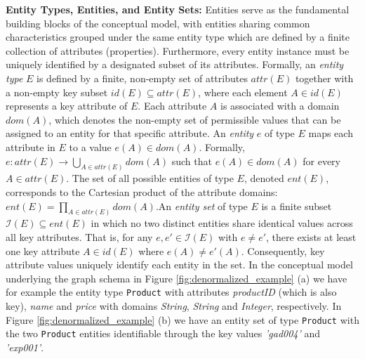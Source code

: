 \documentclass[sigconf]{acmart}
\begin{document}
\textbf{Entity Types, Entities, and Entity Sets:} Entities serve as the fundamental building blocks of the conceptual model, with entities sharing common characteristics grouped under the same entity type which are defined by a finite collection of attributes (properties). Furthermore, every entity instance must be uniquely identified by a designated subset of its attributes. Formally, an \emph{entity type} $E$ is defined by a finite, non-empty set of attributes $\textit{attr}(E)$ together with a non-empty key subset $\textit{id}(E)\subseteq\textit{attr}(E)$, where each element $A\in\textit{id}(E)$ represents a key attribute of $E$. Each attribute $A$ is associated with a domain $\textit{dom}(A)$, which denotes the non-empty set of permissible values that can be assigned to an entity for that specific attribute. An \emph{entity} $e$ of type $E$ maps each attribute in $E$ to a value $e(A)\in\textit{dom}(A)$. Formally, $e:\textit{attr}(E)\rightarrow\bigcup_{A\in\textit{attr}(E)}\textit{dom}(A)$ such that $e(A)\in\textit{dom}(A)$ for every $A\in\textit{attr}(E)$. The set of all possible entities of type $E$, denoted $\textit{ent}(E)$, corresponds to the Cartesian product of the attribute domains: $\textit{ent}(E)=\prod_{A\in\textit{attr}(E)}\textit{dom}(A)$.An \emph{entity set} of type $E$ is a finite subset $\mathcal{I}(E)\subseteq\textit{ent}(E)$ in which no two distinct entities share identical values across all key attributes. That is, for any $e,e'\in\mathcal{I}(E)$ with $e\neq e'$, there exists at least one key attribute $A\in\textit{id}(E)$ where $e(A)\neq e'(A)$. Consequently, key attribute values uniquely identify each entity in the set. In the conceptual model underlying the graph schema in Figure \ref{fig:denormalized_example} (a) we have for example the entity type \texttt{Product} with attributes \textit{productID} (which is also key), \textit{name} and \textit{price} with domains \textit{String}, \textit{String} and \textit{Integer}, respectively. In Figure \ref{fig:denormalized_example} (b) we have an entity set of type \texttt{Product} with the two \texttt{Product} entities identifiable through the key values \textit{'gad004'} and \textit{'exp001'}.
\end{document}
